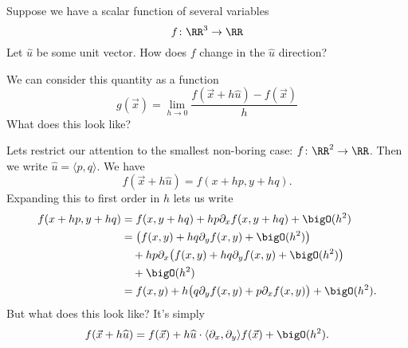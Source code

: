 \M
Suppose we have a scalar function of several variables
\begin{equation}
f\colon\RR^{3}\to\RR
\end{equation}
Let $\widehat{u}$ be some unit vector. How does $f$ change in the
$\widehat{u}$ direction?

We can consider this quantity as a function
\begin{equation}
g(\vec{x}) =
\lim_{h\to0}\frac{f(\vec{x}+h\widehat{u})-f(\vec{x})}{h}
\end{equation}
What does this look like?

\M Lets restrict our attention to the
smallest non-boring case: $f\colon\RR^2\to\RR$. Then we write
$\widehat{u} = \langle p,q\rangle$. We have
\begin{equation}
f(\vec{x}+h\widehat{u}) = f(x+hp,y+hq).
\end{equation}
Expanding this to first order in $h$ lets us write
\begin{equation}
\begin{aligned}
f(x+hp,y+hq) &= f(x,y+hq) +
hp\partial_{x}f(x,y+hq)+\bigO(h^{2})\\
&= \bigl(f(x,y)+hq\partial_{y}f(x,y)+\bigO(h^{2})\bigr)\\
&\quad+hp\partial_{x}\bigl(f(x,y)+hq\partial_{y}f(x,y)+\bigO(h^{2})\bigr)\\
&\quad+\bigO(h^{2})\\
&= f(x,y) + h\bigl(q\partial_{y}f(x,y) +
p\partial_{x}f(x,y)\bigr) +\bigO(h^{2}).
\end{aligned}
\end{equation}
But what does this look like? It's simply
\begin{equation}
f(\vec{x}+h\widehat{u}) = f(\vec{x}) +
h\widehat{u}\cdot\langle\partial_{x},\partial_{y}\rangle
f(\vec{x}) + \bigO(h^{2}).
\end{equation}

